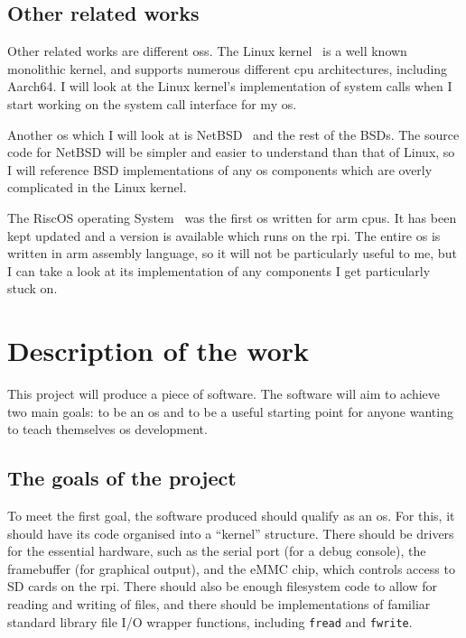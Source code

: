 \documentclass{article}
\begin{document}
\begin{refsection}
\subsection{Other related works}

Other related works are different \glspl{os}. The Linux
kernel~\cite{linux-kernel-git} is a well known monolithic kernel, and supports
numerous different \gls{cpu} architectures, including Aarch64. I will look at
the Linux kernel's implementation of system calls when I start working on the
system call interface for my \gls{os}.

Another \gls{os} which I will look at is NetBSD~\cite{netBSD-git} and the rest
of the BSDs. The source code for NetBSD will be simpler and easier to
understand than that of Linux, so I will reference BSD implementations of any
\gls{os} components which are overly complicated in the Linux kernel.

The RiscOS operating System~\cite{riscOS-source} was the first \gls{os} written
for \gls{arm} \glspl{cpu}. It has been kept updated and a version is available
which runs on the \gls{rpi}. The entire \gls{os} is written in \gls{arm}
assembly language, so it will not be particularly useful to me, but I can take
a look at its implementation of any components I get particularly stuck on.

\printbibliography[heading=relworks]

\end{refsection}

\section{Description of the work}

This project will produce a piece of software. The software will aim to achieve
two main goals: to be an \gls{os} and to be a useful starting point for anyone
wanting to teach themselves \gls{os} development.

\subsection{The goals of the project}
To meet the first goal, the software produced should qualify as an \gls{os}.
For this, it should have its code organised into a ``kernel'' structure. There
should be drivers for the essential hardware, such as the serial port (for a
debug console), the framebuffer (for graphical output), and the eMMC chip,
which controls access to SD cards on the \gls{rpi}. There should also be enough
filesystem code to allow for reading and writing of files, and there should be
implementations of familiar standard library file I/O wrapper functions,
including \texttt{fread} and \texttt{fwrite}.
\end{document}
